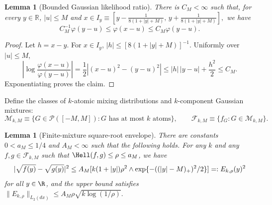 \documentclass[letterpaper,11pt]{article}
\def\exp{\mathop{\rm exp}}
\newcommand{\calF}{{\mathcal{F}}}
\newcommand{\calM}{{\mathcal{M}}}
\newtheorem{lemma}[theorem]{Lemma}
\theoremstyle{definition}
\begin{document}
\begin{lemma}[Bounded Gaussian likelihood ratio]
\label{lmm:local-gaussian-comparability}
There is $C_M<\infty$ such that, for every $y\in\mathbb R$, 
$|u|\le M$ and $x\in I_y \equiv [
y-\frac{1}{8(1+|y|+M)},\,
y+\frac{1}{8(1+|y|+M)}
],$
we have
\[
C_M^{-1}\varphi(y-u)\le \varphi(x-u)\le C_M\varphi(y-u).
\]
\end{lemma}

\begin{proof}
Let $h=x-y$.  For $x\in I_y$,
$|h|\le [8(1+|y|+M)]^{-1}$.  Uniformly over $|u|\le M$,
\[
\left|\log\frac{\varphi(x-u)}{\varphi(y-u)}\right|
=
\frac12\left|(x-u)^2-(y-u)^2\right|
\le
|h|\,|y-u|+\frac{h^2}{2}
\le C_M .
\]
Exponentiating proves the claim.
\end{proof}

Define the classes of $k$-atomic mixing distributions and $k$-component Gaussian mixtures:
\[
\calM_{k,M}
\equiv
\{G\in\mathcal P([-M,M]):G\text{ has at most }k\text{ atoms}\},
\qquad
\calF_{k,M}\equiv\{f_G:G\in\calM_{k,M}\}.
\]

\begin{lemma}[Finite-mixture square-root envelope]
\label{lmm:pairwise-square-root-envelope}
There are constants $0<a_M\le 1/4$ and $A_M<\infty$ such that the
following holds.  
For any $k$ and any $f,g\in\calF_{k,M}$ such that
$\Hell(f,g)\leq \rho \le a_M$, we have \[
    |\sqrt{f(y)}-\sqrt{g(y)}|^2\le A_M [k(1+|y|)\rho^2
\wedge
\exp\{-((|y|-M)_+)^2/2\}] =: E_{k,\rho}(y)^2
\]
for all $y \in \R$, 
and the upper bound satisfies $\|E_{k,\rho}\|_{L_2(dx)}
\le
A_M\rho\sqrt{k\log(1/\rho)}.$

\end{lemma}
\end{document}

